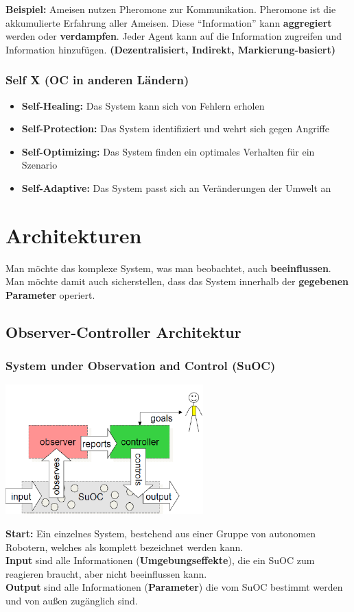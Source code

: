 \documentclass[a4paper]{article}
\begin{document}
\textbf{Beispiel:} Ameisen nutzen Pheromone zur Kommunikation. Pheromone ist die akkumulierte Erfahrung aller Ameisen. Diese ``Information'' kann \textbf{aggregiert} werden oder \textbf{verdampfen}. Jeder Agent kann auf die Information zugreifen und Information hinzufügen. \textbf{(Dezentralisiert, Indirekt, Markierung-basiert)}
\subsubsection{Self X (OC in anderen Ländern)}
\begin{itemize}
	\item \textbf{Self-Healing:} Das System kann sich von Fehlern erholen
	\item \textbf{Self-Protection:} Das System identifiziert und wehrt sich gegen Angriffe
	\item \textbf{Self-Optimizing:} Das System finden ein optimales Verhalten für ein Szenario
	\item \textbf{Self-Adaptive:} Das System passt sich an Veränderungen der Umwelt an
\end{itemize}
\newpage

\section{Architekturen}
Man möchte das komplexe System, was man beobachtet, auch \textbf{beeinflussen}. Man möchte damit auch sicherstellen, dass das System innerhalb der \textbf{gegebenen Parameter} operiert.
\subsection{Observer-Controller Architektur}
\subsubsection{System under Observation and Control (SuOC)}
\begin{center}
	\includegraphics[height = 5cm]{SuOC.png}
\end{center}
\textbf{Start:} Ein einzelnes System, bestehend aus einer Gruppe von autonomen Robotern, welches als komplett bezeichnet werden kann. \\
\textbf{Input} sind alle Informationen (\textbf{Umgebungseffekte}), die ein SuOC zum reagieren braucht, aber nicht beeinflussen kann.\\
\textbf{Output} sind alle Informationen (\textbf{Parameter}) die vom SuOC bestimmt werden und von außen zugänglich sind.\\
\end{document}
